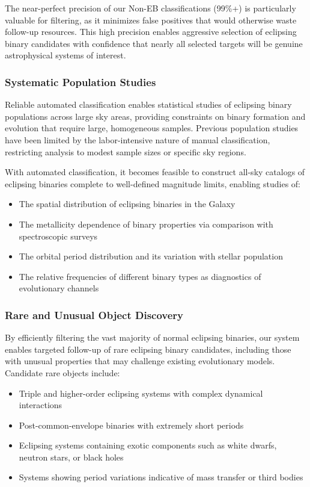 \documentclass[11pt,a4paper]{article}
\begin{document}
The near-perfect precision of our Non-EB classifications (99\%+) is particularly valuable for filtering, as it minimizes false positives that would otherwise waste follow-up resources. This high precision enables aggressive selection of eclipsing binary candidates with confidence that nearly all selected targets will be genuine astrophysical systems of interest.

\subsubsection{Systematic Population Studies}

Reliable automated classification enables statistical studies of eclipsing binary populations across large sky areas, providing constraints on binary formation and evolution that require large, homogeneous samples. Previous population studies have been limited by the labor-intensive nature of manual classification, restricting analysis to modest sample sizes or specific sky regions.

With automated classification, it becomes feasible to construct all-sky catalogs of eclipsing binaries complete to well-defined magnitude limits, enabling studies of:
\begin{itemize}
    \item The spatial distribution of eclipsing binaries in the Galaxy
    \item The metallicity dependence of binary properties via comparison with spectroscopic surveys
    \item The orbital period distribution and its variation with stellar population
    \item The relative frequencies of different binary types as diagnostics of evolutionary channels
\end{itemize}

\subsubsection{Rare and Unusual Object Discovery}

By efficiently filtering the vast majority of normal eclipsing binaries, our system enables targeted follow-up of rare eclipsing binary candidates, including those with unusual properties that may challenge existing evolutionary models. Candidate rare objects include:
\begin{itemize}
    \item Triple and higher-order eclipsing systems with complex dynamical interactions
    \item Post-common-envelope binaries with extremely short periods
    \item Eclipsing systems containing exotic components such as white dwarfs, neutron stars, or black holes
    \item Systems showing period variations indicative of mass transfer or third bodies
\end{itemize}
\end{document}
